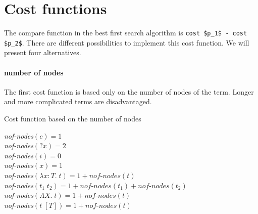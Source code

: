 \section{Cost functions}\label{Cost functions}
The compare function in the best first search algorithm is \lstinline?cost $p_1$ - cost $p_2$?. There are different possibilities to implement this cost function. We will present four alternatives.

  \paragraph{number of nodes}
The first cost function is based only on the number of nodes of the term. Longer and more complicated terms are disadvantaged.
%
\begin{algorithm}
\caption{Cost function based on the number of nodes}

\textit{nof-nodes}$(c) = 1$\\
\textit{nof-nodes}$({?x}) = 2$\\
\textit{nof-nodes}$(i) = 0$\\
\textit{nof-nodes}$(x) = 1$\\
\textit{nof-nodes}$(\lambda x : T.\; t) = 1 + \textit{nof-nodes}(t)$\\
\textit{nof-nodes}$(t_1\; t_2) = 1 + \textit{nof-nodes}(t_1) + \textit{nof-nodes}(t_2)$\\
\textit{nof-nodes}$(\Lambda X.\; t) = 1 + \textit{nof-nodes}(t)$\\
\textit{nof-nodes}$(t\; [T]) = 1 + \textit{nof-nodes}(t)$\\

\end{algorithm} 
%
